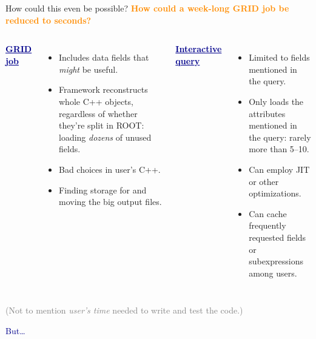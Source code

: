 \documentclass{beamer}
\begin{document}
\begin{frame}{How could this even be possible?}
\vspace{0.5 cm}
\textcolor{darkorange}{\bf How could a week-long GRID job be reduced to seconds?}

\vspace{0.5 cm}
\begin{columns}[t]
\textcolor{darkblue}{\underline{\bf GRID job}}

\begin{itemize}
\item Includes data fields that {\it might} be useful.

\item Framework reconstructs whole C++ objects, regardless of whether they're split in ROOT: loading {\it dozens} of unused fields.

\item Bad choices in user's C++.

\item Finding storage for and moving the big output files.
\end{itemize}

\textcolor{darkblue}{\underline{\bf Interactive query}}

\begin{itemize}
\item Limited to fields mentioned in the query.

\item Only loads the attributes mentioned in the query: rarely more than 5--10.

\item Can employ JIT or other optimizations.

\item Can cache frequently requested fields or subexpressions among users.
\end{itemize}
\end{columns}

\vspace{0.5 cm}
\textcolor{gray}{(Not to mention {\it user's time} needed to write and test the code.)}
\end{frame}

\begin{frame}{}
\begin{center}
\textcolor{darkblue}{\huge But\ldots}
\end{center}
\end{frame}
\end{document}
